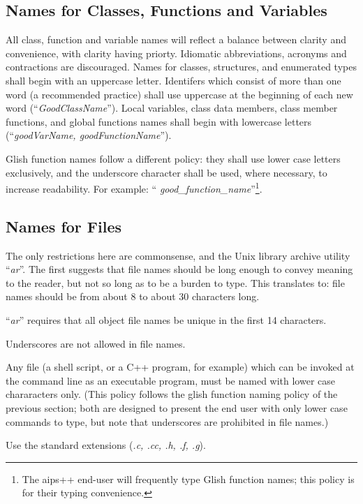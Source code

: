 \subsection {Names for Classes, Functions and Variables}
All class, function and variable names will reflect a balance between
clarity and convenience, with clarity having priorty.  Idiomatic 
abbreviations, acronyms and contractions are discouraged.
Names for classes, structures, and enumerated types shall begin with
an uppercase letter.  Identifers which consist of more than one word
(a recommended practice) shall use uppercase at the beginning of each
new word (``{\em GoodClassName}'').  Local variables, class data members,
class member functions, and global functions names shall begin with
lowercase letters (``{\em goodVarName, goodFunctionName}'').  

Glish function names follow a different policy: they shall use lower
case letters exclusively, and the underscore character shall be used,
where necessary, to increase readability.  For example: ``{\em
good\_function\_name}''\footnote {The aips++ end-user will frequently
type Glish function names; this policy is for their typing convenience.}.
\subsection {Names for Files} The only restrictions here are
commonsense, and the Unix library archive utility ``{\em ar}''.  The
first suggests that file names should be long enough to convey meaning
to the reader, but not so long as to be a burden to type. This
translates to: file names should be from about 8 to about 30
characters long.

``{\em ar}'' requires that all object file names be unique in the first 14
characters.  

Underscores are not allowed in file names.

Any file (a shell script, or a C++ program, for example) which can be
invoked at the command line as an executable program, must be named
with lower case chararacters only.  (This policy follows the glish function
naming policy of the previous section; both are designed to present the 
end user with only lower case commands to type, but note that underscores
are prohibited in file names.)

Use the standard extensions ({\em .c, .cc, .h, .f, .g}).

